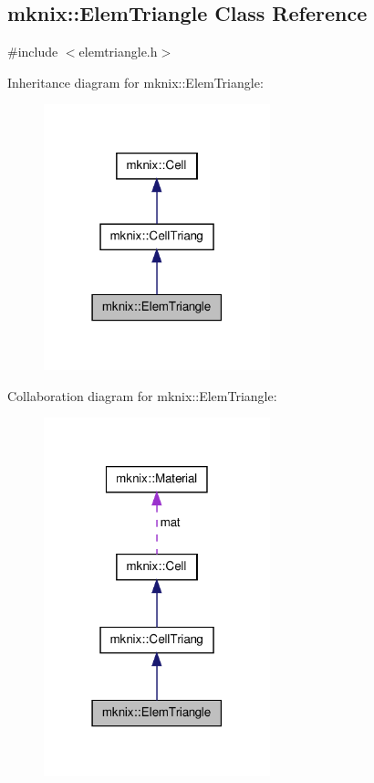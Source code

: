 \hypertarget{classmknix_1_1_elem_triangle}{\subsection{mknix\-:\-:Elem\-Triangle Class Reference}
\label{classmknix_1_1_elem_triangle}
}


{\ttfamily \#include $<$elemtriangle.\-h$>$}



Inheritance diagram for mknix\-:\-:Elem\-Triangle\-:\nopagebreak
\begin{figure}[H]
\begin{center}
\leavevmode
\includegraphics[width=186pt]{d6/db0/classmknix_1_1_elem_triangle__inherit__graph}
\end{center}
\end{figure}


Collaboration diagram for mknix\-:\-:Elem\-Triangle\-:\nopagebreak
\begin{figure}[H]
\begin{center}
\leavevmode
\includegraphics[width=186pt]{dd/df8/classmknix_1_1_elem_triangle__coll__graph}
\end{center}
\end{figure}
